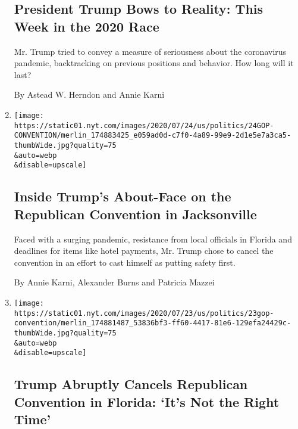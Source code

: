 \begin{enumerate}
{  \subsection{President Trump Bows to Reality: This Week in the 2020
  Race}\label{president-trump-bows-to-reality-this-week-in-the-2020-race}}

  Mr. Trump tried to convey a measure of seriousness about the
  coronavirus pandemic, backtracking on previous positions and behavior.
  How long will it last?

  By Astead W. Herndon and Annie Karni
\item
  \href{/2020/07/24/us/politics/trump-republican-convention-canceled-jacksonville.html}{}

  \texttt{[image: https://static01.nyt.com/images/2020/07/24/us/politics/24GOP-CONVENTION/merlin\_174883425\_e059ad0d-c7f0-4a89-99e9-2d1e5e7a3ca5-thumbWide.jpg?quality=75\\\&auto=webp\\\&disable=upscale]}

  \hypertarget{inside-trumps-about-face-on-the-republican-convention-in-jacksonville}{%
  \subsection{Inside Trump's About-Face on the Republican Convention in
  Jacksonville}\label{inside-trumps-about-face-on-the-republican-convention-in-jacksonville}}

  Faced with a surging pandemic, resistance from local officials in
  Florida and deadlines for items like hotel payments, Mr. Trump chose
  to cancel the convention in an effort to cast himself as putting
  safety first.

  By Annie Karni, Alexander Burns and Patricia Mazzei
\item
  \href{/2020/07/23/us/politics/jacksonville-rnc.html}{}

  \texttt{[image: https://static01.nyt.com/images/2020/07/23/us/politics/23gop-convention/merlin\_174881487\_53836bf3-ff60-4417-81e6-129efa24429c-thumbWide.jpg?quality=75\\\&auto=webp\\\&disable=upscale]}

  \hypertarget{trump-abruptly-cancels-republican-convention-in-florida-its-not-the-right-time}{%
  \subsection{Trump Abruptly Cancels Republican Convention in Florida:
  `It's Not the Right
  Time'}\label{trump-abruptly-cancels-republican-convention-in-florida-its-not-the-right-time}}


\end{enumerate}
